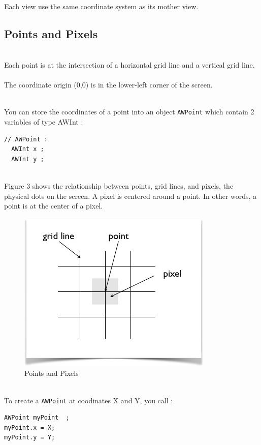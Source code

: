 \documentclass[a4paper,11pt]{extarticle}
\begin{document}
~\\ Each view use the same coordinate system as its mother view. 



\newpage
\subsection{Points and Pixels}

~\\Each point is at the intersection of a horizontal grid line and a vertical grid line. 
~\\The coordinate origin (0,0) is in the lower-left corner of the screen. 

~\\You can store the coordinates of a point into an object \texttt{AWPoint} which contain 2 variables of type AWInt :

\begin{lstlisting}[language=Arduinonl]
// AWPoint :
  AWInt x ;
  AWInt y ;
\end{lstlisting}

~\\Figure 3 shows the relationship between points, grid lines, and pixels, the physical dots on the screen. 
A pixel is centered around a point. In other words, a point is at the center of a pixel.

\begin{figure}[htbp]
   \centering
   \includegraphics[scale=0.8]{AWFig3.png} 
   \caption{Points and Pixels}
   \label{fig:3 }
\end{figure}


~\\To create a \texttt{AWPoint} at coodinates X and Y, you call :
\begin{lstlisting}[language=Arduinonl]
AWPoint myPoint  ;
myPoint.x = X;
myPoint.y = Y;
\end{lstlisting}
\end{document}
